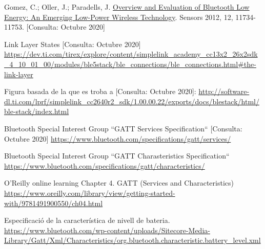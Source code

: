 \begin{thebibliography}{2}
Gomez, C.; Oller, J.; Paradells, J.  \href{https://www.mdpi.com/1424-8220/12/9/11734}{Overview and Evaluation of Bluetooth Low Energy: An Emerging Low-Power Wireless Technology}. Sensors 2012, 12, 11734-11753.
[Consulta: Octubre 2020]

Link Layer States [Consulta: Octubre 2020]\newline
\href{https://dev.ti.com/tirex/explore/content/simplelink_academy_cc13x2_26x2sdk_4_10_01_00/modules/ble5stack/ble_connections/ble_connections.html\#the-link-layer}{https://dev.ti.com/tirex/explore/content/simplelink\_academy\_cc13x2\_26x2sdk\_4\_10\_01\_00/modules/ble5stack/ble\_connections/ble\_connections.html\#the-link-layer}

Figura basada de la que es troba a [Consulta: Octubre 2020]:\newline
\href{http://software-dl.ti.com/lprf/simplelink_cc2640r2_sdk/1.00.00.22/exports/docs/blestack/html/ble-stack/index.html}{http://software-dl.ti.com/lprf/simplelink\_cc2640r2\_sdk/1.00.00.22/exports/docs/blestack/html/ble-stack/index.html}

Bluetooth Special Interest Group
``GATT Services Specification``
[Consulta: Octubre 2020]\newline
\href{https://www.bluetooth.com/specifications/gatt/services/}{https://www.bluetooth.com/specifications/gatt/services/}

Bluetooth Special Interest Group ``GATT Charasteristics Specification``\newline
\href{https://www.bluetooth.com/specifications/gatt/characteristics/}{https://www.bluetooth.com/specifications/gatt/characteristics/}

O’Reilly online learning
Chapter 4. GATT (Services and Characteristics)  \newline
\href{https://www.oreilly.com/library/view/getting-started-with/9781491900550/ch04.html}{https://www.oreilly.com/library/view/getting-started-with/9781491900550/ch04.html}

Especificació de la característica de nivell de bateria.\newline
\href{https://www.bluetooth.com/wp-content/uploads/Sitecore-Media-Library/Gatt/Xml/Characteristics/org.bluetooth.characteristic.battery\_level.xml}{https://www.bluetooth.com/wp-content/uploads/Sitecore-Media-Library/Gatt/Xml/Characteristics/org.bluetooth.characteristic.battery\_level.xml}


\end{thebibliography}
